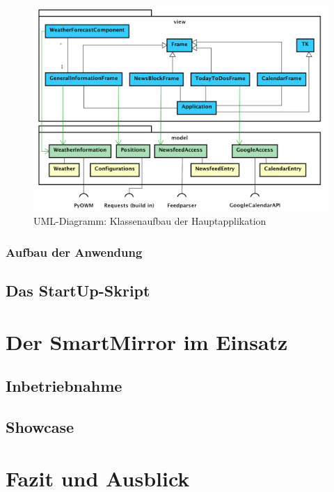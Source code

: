 \begin{figure}
	\centering
	\includegraphics[width=0.7\linewidth]{bilder/umlDiagramNoBackground}
	\caption[UML-Diagramm: Klassenaufbau der Hauptapplikation]{UML-Diagramm: Klassenaufbau der Hauptapplikation}
	\label{fig:umldiagramClasses}
\end{figure}





\subsubsection*{Aufbau der Anwendung}


\subsection{Das StartUp-Skript}

\section{Der SmartMirror im Einsatz}
\subsection{Inbetriebnahme}
\subsection{Showcase}

\section{Fazit und Ausblick}
